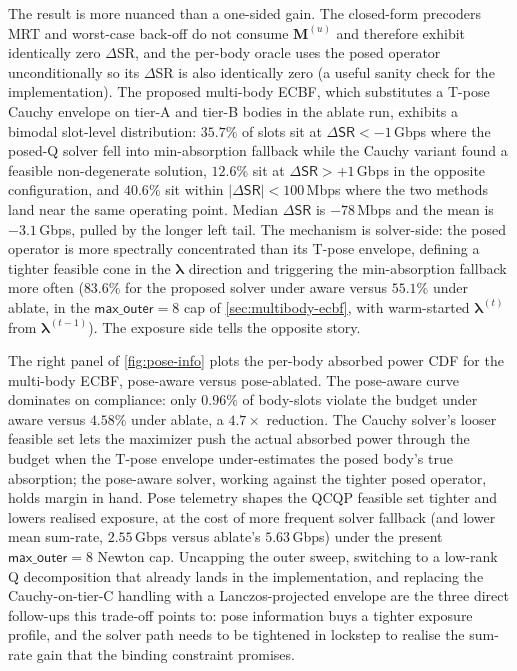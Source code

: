\documentclass[journal,twocolumn,10pt]{IEEEtran}
\theoremstyle{plain}
\theoremstyle{remark}
\newcommand{\Mmat}{\mathbf{M}}
\begin{document}
The result is more nuanced than a one-sided gain. The closed-form
precoders MRT and worst-case back-off do not consume $\Mmat^{(u)}$
and therefore exhibit identically zero $\Delta$\textsf{SR}, and the
per-body oracle uses the posed operator unconditionally so its
$\Delta$\textsf{SR} is also identically zero (a useful sanity check
for the implementation). The proposed multi-body ECBF, which
substitutes a T-pose Cauchy envelope on tier-A and tier-B bodies in
the ablate run, exhibits a bimodal slot-level distribution: $35.7\%$
of slots sit at $\Delta\textsf{SR} < -1\,$Gbps where the posed-Q
solver fell into min-absorption fallback while the Cauchy variant
found a feasible non-degenerate solution, $12.6\%$ sit at
$\Delta\textsf{SR} > +1\,$Gbps in the opposite configuration, and
$40.6\%$ sit within $|\Delta\textsf{SR}| < 100\,$Mbps where the two
methods land near the same operating point. Median
$\Delta\textsf{SR}$ is $-78\,$Mbps and the mean is $-3.1\,$Gbps,
pulled by the longer left tail. The mechanism is solver-side: the
posed operator is more spectrally concentrated than its T-pose
envelope, defining a tighter feasible cone in the $\bm\lambda$
direction and triggering the min-absorption fallback more often
($83.6\%$ for the proposed solver under aware versus $55.1\%$ under
ablate, in the $\textsf{max\_outer} = 8$ cap of
\cref{sec:multibody-ecbf}, with warm-started
$\bm\lambda^{(t)}$ from $\bm\lambda^{(t-1)}$). The exposure side
tells the opposite story.

The right panel of \cref{fig:pose-info} plots the per-body absorbed
power CDF for the multi-body ECBF, pose-aware versus pose-ablated.
The pose-aware curve dominates on compliance: only $0.96\%$ of
body-slots violate the budget under aware versus $4.58\%$ under
ablate, a $4.7\times$ reduction. The Cauchy solver's looser
feasible set lets the maximizer push the actual absorbed power
through the budget when the T-pose envelope under-estimates the
posed body's true absorption; the pose-aware solver, working against
the tighter posed operator, holds margin in hand. Pose telemetry
shapes the QCQP feasible set tighter and lowers realised exposure,
at the cost of more frequent solver fallback (and lower mean
sum-rate, $2.55\,$Gbps versus ablate's $5.63\,$Gbps) under the
present $\textsf{max\_outer} = 8$ Newton cap. Uncapping the outer
sweep, switching to a low-rank Q decomposition that already lands
in the implementation, and replacing the Cauchy-on-tier-C handling
with a Lanczos-projected envelope are the three direct follow-ups
this trade-off points to: pose information buys a tighter exposure
profile, and the solver path needs to be tightened in lockstep to
realise the sum-rate gain that the binding constraint promises.
\end{document}
